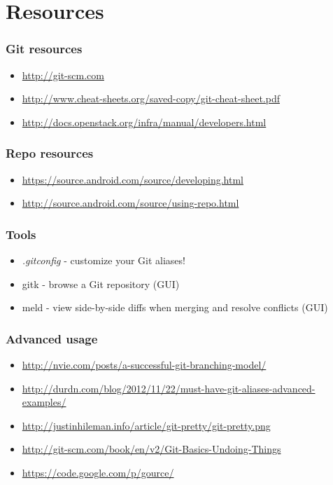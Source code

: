 \section{Resources}
\begin{frame}
  \frametitle{Git resources}
  \begin{itemize}
    \item \url{http://git-scm.com}
    \item \url{http://www.cheat-sheets.org/saved-copy/git-cheat-sheet.pdf}
    \item \url{http://docs.openstack.org/infra/manual/developers.html}
  \end{itemize}
\end{frame}

\begin{frame}
  \frametitle{Repo resources}
  \begin{itemize}
    \item \url{https://source.android.com/source/developing.html}
    \item \url{http://source.android.com/source/using-repo.html}
  \end{itemize}
\end{frame}

\begin{frame}
  \frametitle{Tools}
  \begin{itemize}
    \item \textit{.gitconfig} - customize your Git aliases!
    \item gitk - browse a Git repository (GUI)
    \item meld - view side-by-side diffs when merging and resolve conflicts (GUI)
  \end{itemize}
\end{frame}

\begin{frame}
  \frametitle{Advanced usage}
  \begin{itemize}
    \item \url{http://nvie.com/posts/a-successful-git-branching-model/}
    \item \url{http://durdn.com/blog/2012/11/22/must-have-git-aliases-advanced-examples/}
    \item \url{http://justinhileman.info/article/git-pretty/git-pretty.png}
    \item \url{http://git-scm.com/book/en/v2/Git-Basics-Undoing-Things}
    \item \url{https://code.google.com/p/gource/}
  \end{itemize}
\end{frame}

